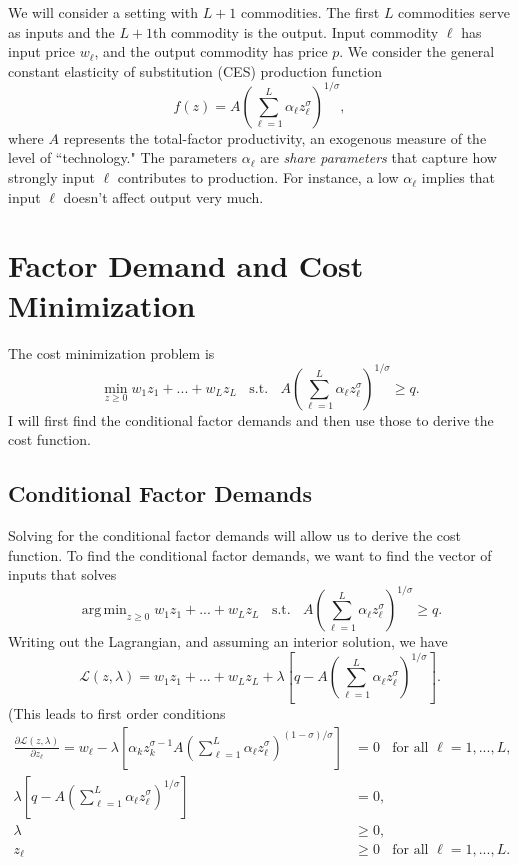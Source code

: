\documentclass[12pt]{article}
\DeclareMathOperator*{\argmin}{arg\,min}
\theoremstyle{definition}
\begin{document}
\maketitle
\onehalfspace


We will consider a setting with $L+1$ commodities. The first $L$ commodities serve as inputs and the $L+1$th commodity is the output. Input commodity $\ell$ has input price $w_{\ell}$, and the output commodity has price $p$. We consider the general constant elasticity of substitution (CES) production function
	\[	f(z)=A \left(\sum_{\ell = 1}^L \alpha_{\ell} z_{\ell}^{\sigma} \right)^{1 / \sigma},\]
where $A$ represents the total-factor productivity, an exogenous measure of the level of ``technology." The parameters $\alpha_{\ell}$ are \emph{share parameters} that capture how strongly input $\ell$ contributes to production. For instance, a low $\alpha_{\ell}$ implies that input $\ell$ doesn't affect output very much. 


\section{Factor Demand and Cost Minimization}
The cost minimization problem is
	\[	\min_{z \geq 0} w_1z_1 + ... + w_{L}z_{L}  \;\; \text{ s.t. } \;\; A \left(\sum_{\ell = 1}^L \alpha_{\ell} z_{\ell}^{\sigma} \right)^{1 / \sigma} \geq q. \]	
I will first find the conditional factor demands and then use those to derive the cost function. 
    
    
\subsection{Conditional Factor Demands}
	Solving for the conditional factor demands will allow us to derive the cost function. To find the conditional factor demands, we want to find the vector of inputs that solves
	\[	\argmin_{z \geq 0} w_1z_1 + ... + w_{L}z_{L}  \;\; \text{ s.t. } \;\; A \left(\sum_{\ell = 1}^L \alpha_{\ell} z_{\ell}^{\sigma} \right)^{1 / \sigma} \geq q. \]	
	Writing out the Lagrangian, and assuming an interior solution, we have
	\[	\mathcal{L}(z, \lambda) = 	w_1z_1 + ... + w_{L}z_{L}  + \lambda \left[q - A \left(\sum_{\ell = 1}^L \alpha_{\ell} z_{\ell}^{\sigma} \right)^{1 / \sigma} \right] . \]
	(This leads to first order conditions
\begin{align}
	\frac{\partial \mathcal{L}(z, \lambda)}{\partial z_{\ell}} = w_{\ell} - \lambda \left[  \alpha_k z_k^{\sigma - 1} A \left(\sum_{\ell = 1}^L \alpha_{\ell} z_{\ell}^{\sigma} \right)^{(1 - \sigma)/\sigma} \right] &= 0  \;\; \text{ for all } {\ell}=1,...,L, \label{costfoc1}\\
	 \lambda \left[q - A \left(\sum_{\ell = 1}^L \alpha_{\ell} z_{\ell}^{\sigma} \right)^{1 / \sigma} \right] &=0, \label{costfoc2}\\
     \lambda &\geq 0,\\
     z_{\ell} &\geq 0 \;\; \text{ for all } \ell=1, ..., L.     
\end{align}	
\end{document}
